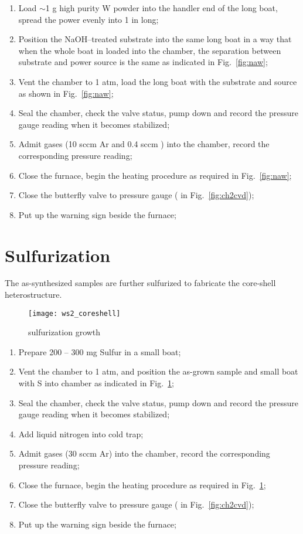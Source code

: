 \begin{enumerate}
\item Load $\sim$1 g high purity W powder into the handler end of the long boat, spread the power evenly into 1 in long;
\item Position the NaOH--treated substrate into the same long boat in a way that when the whole boat in loaded into the chamber, the separation between substrate and power source is the same as indicated in Fig.~\ref{fig:naw};
\item Vent the chamber to 1 atm, load the long boat with the substrate and source as shown in Fig.~\ref{fig:naw};
\item Seal the chamber, check the valve status, pump down and record the pressure gauge reading when it becomes stabilized; 
\item Admit gases (10 sccm Ar and 0.4 sccm ) into the chamber, record the corresponding pressure reading;
\item Close the furnace, begin the heating procedure as required in Fig.~\ref{fig:naw}; 
\item Close the butterfly valve to pressure gauge ( in Fig.~\ref{fig:ch2cvd});
\item Put up the warning sign beside the furnace;
\end{enumerate}

\section{Sulfurization}

The as-synthesized  samples are further sulfurized to fabricate the core-shell heterostructure. 

\begin{figure}[htb]
\centering
\texttt{[image: ws2\_coreshell]}
\caption{ sulfurization growth}
\label{fig:suf}
\end{figure}

\begin{enumerate}
\item Prepare 200 -- 300 mg Sulfur in a small boat;
\item Vent the chamber to 1 atm, and position the as-grown  sample and small boat with S into chamber as indicated in Fig.~\ref{fig:suf};
\item Seal the chamber, check the valve status, pump down and record the pressure gauge reading when it becomes stabilized; 
\item Add liquid nitrogen into cold trap; 
\item Admit gases (30 sccm Ar) into the chamber, record the corresponding pressure reading;
\item Close the furnace, begin the heating procedure as required in Fig.~\ref{fig:suf}; 
\item Close the butterfly valve to pressure gauge ( in Fig.~\ref{fig:ch2cvd});
\item Put up the warning sign beside the furnace;
\end{enumerate}


